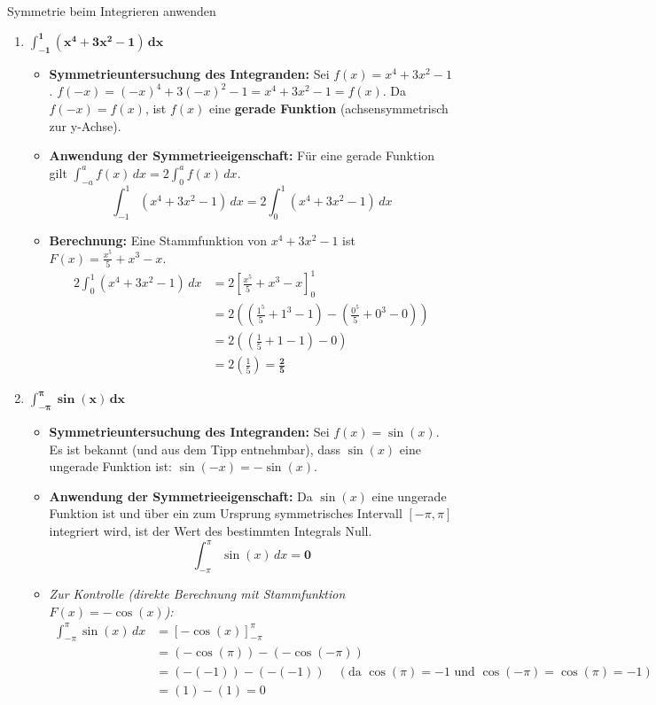 \begin{loesungsumgebung}{Symmetrie beim Integrieren anwenden}
\begin{enumerate}[label=(\alph*)]
    \item $\mathbf{\int_{-1}^{1} (x^4 + 3x^2 - 1) \,dx}$
    \begin{itemize}
        \item \textbf{Symmetrieuntersuchung des Integranden:}
        Sei $f(x) = x^4 + 3x^2 - 1$.
        $f(-x) = (-x)^4 + 3(-x)^2 - 1 = x^4 + 3x^2 - 1 = f(x)$.
        Da $f(-x) = f(x)$, ist $f(x)$ eine \textbf{gerade Funktion} (achsensymmetrisch zur y-Achse).
        \item \textbf{Anwendung der Symmetrieeigenschaft:}
        Für eine gerade Funktion gilt $\int_{-a}^{a} f(x) \,dx = 2 \int_{0}^{a} f(x) \,dx$.
        $$ \int_{-1}^{1} (x^4 + 3x^2 - 1) \,dx = 2 \int_{0}^{1} (x^4 + 3x^2 - 1) \,dx $$
        \item \textbf{Berechnung:}
        Eine Stammfunktion von $x^4 + 3x^2 - 1$ ist $F(x) = \frac{x^5}{5} + x^3 - x$.
        \begin{align*}
        2 \int_{0}^{1} (x^4 + 3x^2 - 1) \,dx &= 2 \left[ \frac{x^5}{5} + x^3 - x \right]_{0}^{1} \\
        &= 2 \left( \left(\frac{1^5}{5} + 1^3 - 1\right) - \left(\frac{0^5}{5} + 0^3 - 0\right) \right) \\
        &= 2 \left( \left(\frac{1}{5} + 1 - 1\right) - 0 \right) \\
        &= 2 \left( \frac{1}{5} \right) = \mathbf{\frac{2}{5}}
        \end{align*}
    \end{itemize}

    \item $\mathbf{\int_{-\pi}^{\pi} \sin(x) \,dx}$
    \begin{itemize}
        \item \textbf{Symmetrieuntersuchung des Integranden:}
        Sei $f(x) = \sin(x)$. Es ist bekannt (und aus dem Tipp entnehmbar), dass $\sin(x)$ eine ungerade Funktion ist: $\sin(-x) = -\sin(x)$.
        \item \textbf{Anwendung der Symmetrieeigenschaft:}
        Da $\sin(x)$ eine ungerade Funktion ist und über ein zum Ursprung symmetrisches Intervall $[-\pi, \pi]$ integriert wird, ist der Wert des bestimmten Integrals Null.
        $$ \int_{-\pi}^{\pi} \sin(x) \,dx = \mathbf{0} $$
        \item \textit{Zur Kontrolle (direkte Berechnung mit Stammfunktion $F(x)=-\cos(x)$):}
        \begin{align*}
        \int_{-\pi}^{\pi} \sin(x) \,dx &= [-\cos(x)]_{-\pi}^{\pi} \\
        &= (-\cos(\pi)) - (-\cos(-\pi)) \\
        &= (-(-1)) - (-(-1)) \quad (\text{da } \cos(\pi)=-1 \text{ und } \cos(-\pi)=\cos(\pi)=-1) \\
        &= (1) - (1) = 0
        \end{align*}
    \end{itemize}
\end{enumerate}

\end{loesungsumgebung}

